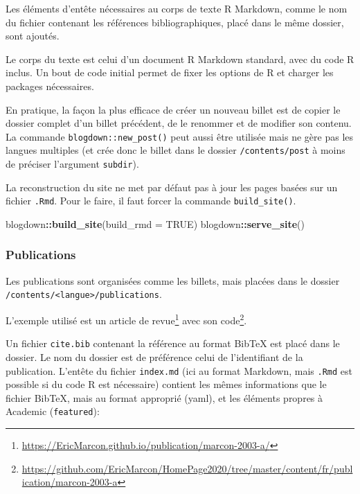 \documentclass[
  12pt,
  french,
  a4paper,
  extrafontsizes,onecolumn,openright
  ]{memoir}
\newenvironment{Shaded}{\begin{snugshade}}{\end{snugshade}}
\newcommand{\AttributeTok}[1]{\textcolor[rgb]{0.13,0.29,0.53}{#1}}
\newcommand{\ConstantTok}[1]{\textcolor[rgb]{0.56,0.35,0.01}{#1}}
\newcommand{\FunctionTok}[1]{\textcolor[rgb]{0.13,0.29,0.53}{\textbf{#1}}}
\newcommand{\NormalTok}[1]{#1}
\newcommand{\SpecialCharTok}[1]{\textcolor[rgb]{0.81,0.36,0.00}{\textbf{#1}}}
\begin{document}
Les éléments d'entête nécessaires au corps de texte R Markdown, comme le nom du fichier contenant les références bibliographiques, placé dans le même dossier, sont ajoutés.

Le corps du texte est celui d'un document R Markdown standard, avec du code R inclus.
Un bout de code initial permet de fixer les options de R et charger les packages nécessaires.

En pratique, la façon la plus efficace de créer un nouveau billet est de copier le dossier complet d'un billet précédent, de le renommer et de modifier son contenu.
La commande \texttt{blogdown::new\_post()} peut aussi être utilisée mais ne gère pas les langues multiples (et crée donc le billet dans le dossier \texttt{/contents/post} à moins de préciser l'argument \texttt{subdir}).

La reconstruction du site ne met par défaut pas à jour les pages basées sur un fichier \texttt{.Rmd}.
Pour le faire, il faut forcer la commande \texttt{build\_site()}.

\scriptsize

\begin{Shaded}
\begin{Highlighting}[]
\NormalTok{blogdown}\SpecialCharTok{::}\FunctionTok{build\_site}\NormalTok{(}\AttributeTok{build\_rmd =} \ConstantTok{TRUE}\NormalTok{)}
\NormalTok{blogdown}\SpecialCharTok{::}\FunctionTok{serve\_site}\NormalTok{()}
\end{Highlighting}
\end{Shaded}

\normalsize

\subsubsection{Publications}\label{publications}

Les publications sont organisées comme les billets, mais placées dans le dossier \texttt{/contents/\textless{}langue\textgreater{}/publications}.

L'exemple utilisé est un article de revue\footnote{\url{https://EricMarcon.github.io/publication/marcon-2003-a/}} avec son code\footnote{\url{https://github.com/EricMarcon/HomePage2020/tree/master/content/fr/publication/marcon-2003-a}}.

Un fichier \texttt{cite.bib} contenant la référence au format BibTeX est placé dans le dossier.
Le nom du dossier est de préférence celui de l'identifiant de la publication.
L'entête du fichier \texttt{index.md} (ici au format Markdown, mais \texttt{.Rmd} est possible si du code R est nécessaire) contient les mêmes informations que le fichier BibTeX, mais au format approprié (yaml), et les éléments propres à Academic (\texttt{featured}):
\end{document}

